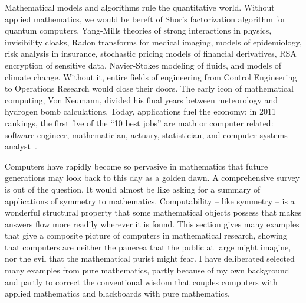 \documentclass{llncs}
\begin{document}
Mathematical models and algorithms rule the quantitative world.
Without applied mathematics, we would be bereft of Shor's
factorization algorithm for quantum computers, Yang-Mills theories of
strong interactions in physics, invisibility cloaks, Radon transforms
for medical imaging, models of epidemiology, risk analysis in
insurance, stochastic pricing models of financial derivatives, RSA
encryption of sensitive data, Navier-Stokes modeling of fluids, and
models of climate change.
Without it, entire fields of engineering from Control Engineering to
Operations Research would close their doors.  The early icon of
mathematical computing, Von Neumann, divided his final years between
meteorology and hydrogen bomb calculations.
Today, applications fuel the
economy: in 2011 rankings, the first five of the ``10 best jobs'' are
math or computer related: software engineer, mathematician, actuary,
statistician, and computer systems analyst~\cite{CC11}.  








\bigskip

Computers have rapidly become so pervasive in mathematics that future
generations may look back to this day as a golden dawn.  A
comprehensive survey is out of the question.  It would almost be like
asking for a summary of applications of symmetry to mathematics.
Computability -- like symmetry -- is a wonderful structural property
that some mathematical objects possess that makes answers flow more
readily wherever it is found.  This section gives many examples that
give a composite picture of computers in mathematical research,
showing that computers are neither the panecea that the public at
large might imagine, nor the evil that the mathematical purist might
fear.  I have deliberated selected many examples from pure
mathematics, partly because of my own background and partly to correct
the conventional wisdom that couples computers with applied
mathematics and blackboards with pure mathematics.
\end{document}
